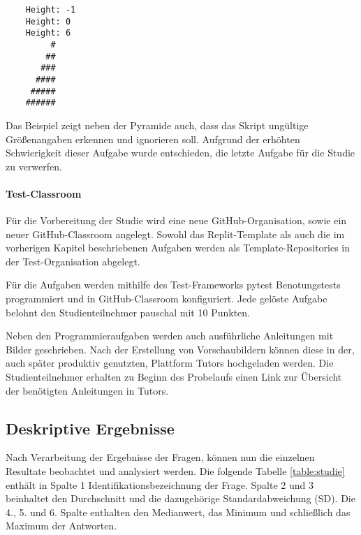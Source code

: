 \begin{lstlisting}
    Height: -1
    Height: 0
    Height: 6
         #
        ##
       ###
      ####
     #####
    ######
\end{lstlisting}

Das Beispiel zeigt neben der Pyramide auch, dass das Skript ungültige
Größenangaben erkennen und ignorieren soll. Aufgrund der erhöhten Schwierigkeit
dieser Aufgabe wurde entschieden, die letzte Aufgabe für die Studie zu
verwerfen.

\paragraph{Test-Classroom}
Für die Vorbereitung der Studie wird eine neue GitHub-Organisation, sowie ein
neuer GitHub-Classroom angelegt. Sowohl das Replit-Template als auch die im
vorherigen Kapitel beschriebenen Aufgaben werden als Template-Repositories in
der Test-Organisation abgelegt.

Für die Aufgaben werden mithilfe des Test-Frameworks pytest Benotungstests
programmiert und in GitHub-Classroom konfiguriert. Jede gelöste Aufgabe belohnt
den Studienteilnehmer pauschal mit 10 Punkten.

Neben den Programmieraufgaben werden auch ausführliche Anleitungen mit
Bilder geschrieben. Nach der Erstellung von Vorschaubildern können diese in der,
auch später produktiv genutzten, Plattform Tutors hochgeladen werden. Die
Studienteilnehmer erhalten zu Beginn des Probelaufs einen Link zur Übersicht der benötigten Anleitungen in Tutors.

\newpage
\subsection{Deskriptive Ergebnisse}
Nach Verarbeitung der Ergebnisse der Fragen, können nun die einzelnen Resultate
beobachtet und analysiert werden. Die folgende Tabelle \ref{table:studie}
enthält in Spalte 1 Identifikationsbezeichnung der Frage. Spalte 2 und 3
beinhaltet den Durchschnitt und die dazugehörige Standardabweichung (SD).
Die 4., 5. und 6. Spalte enthalten den Medianwert, das Minimum und 
schließlich das Maximum der Antworten.

